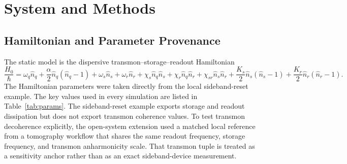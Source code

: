\documentclass[11pt]{article}
\begin{document}
\section{System and Methods}
\subsection{Hamiltonian and Parameter Provenance}
The static model is the dispersive transmon--storage--readout Hamiltonian
\begin{equation}
\frac{H_0}{\hbar} =
\omega_q \hat n_q
+ \frac{\alpha}{2}\hat n_q(\hat n_q-1)
+ \omega_s \hat n_s
+ \omega_r \hat n_r
+ \chi_s \hat n_q \hat n_s
+ \chi_r \hat n_q \hat n_r
+ \chi_{sr} \hat n_s \hat n_r
+ \frac{K_s}{2}\hat n_s(\hat n_s-1)
+ \frac{K_r}{2}\hat n_r(\hat n_r-1).
\label{eq:drift}
\end{equation}
The Hamiltonian parameters were taken directly from the local sideband-reset example. The key values used in every simulation are listed in Table~\ref{tab:params}. The sideband-reset example exports storage and readout dissipation but does not export transmon coherence values. To test transmon decoherence explicitly, the open-system extension used a matched local reference from a tomography workflow that shares the same readout frequency, storage frequency, and transmon anharmonicity scale. That transmon tuple is treated as a sensitivity anchor rather than as an exact sideband-device measurement.
\end{document}
